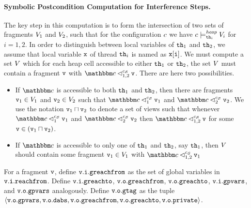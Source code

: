 \paragraph{Symbolic Postcondition Computation for Interference Steps.} 
The key step in this computation is
to form the intersection of two sets of fragments
$V_1$ and $V_2$, such that for the configuration $c$
we have $c \models_{{\tt th}_i}^{\mathit{heap}} V_i$ for $i=1,2$.
In order to distinguish
between local variables of ${\tt th}_1$ and ${\tt th}_2$, we assume that local variable $\mathtt{x}$ of thread ${\tt th}_i$ is named as $\mathtt{x[i]}$.
We must compute a set $V$ which for each
heap cell accessible to either ${\tt th}_1$ or ${\tt th}_2$, the set $V$ must
contain a fragment $\mathtt{v}$ with $\cell \satfrag{1,2}{\sconf} \frag$.
There are  here two possibilities.
\begin{itemize}
\item If $\cell$ is accessible to both ${\tt th}_1$ and ${\tt th}_2$, then
  there are fragments $\mathtt{v}_1 \in V_1$ and $\mathtt{v}_2 \in V_2$
  such that $\cell \satfrag{1}{\sconf} \frag_1$ and $\cell \satfrag{2}{\sconf} \frag_2$.
  We use the notation $\mathtt{v}_1 \sqcap \mathtt{v}_2$ to denote a set of views such that
  whenever $\cell \satfrag{1}{\sconf} \frag_1$ and $\cell \satfrag{2}{\sconf} \frag_2$ then
  $\cell \satfrag{1,2}{\sconf} \frag$ for some $\mathtt{v} \in (\mathtt{v}_1 \sqcap \mathtt{v}_2)$.
\item If $\cell$ is accessible to only one of ${\tt th}_1$ and ${\tt th}_2$,
  say ${\tt th}_1$, then $V$ should contain some fragment
  $\mathtt{v}_1 \in V_1$ with $\cell \satfrag{1,2}{\sconf} \frag_1$
\end{itemize}
For a fragment $\mathtt{v}$, define
$\mathtt{v}.\mathtt{i}.\mathtt{greachfrom}$ as the set of global variables in
$\mathtt{v}.\mathtt{i}.\mathtt{reachfrom}$. Define
$\mathtt{v}.\mathtt{i}.\mathtt{greachto}$,
$\mathtt{v}.\mathtt{o}.\mathtt{greachfrom}$,
$\mathtt{v}.\mathtt{o}.\mathtt{greachto}$,
$\mathtt{v}.\mathtt{i}.\mathtt{gpvars}$, and
$\mathtt{v}.\mathtt{o}.\mathtt{gpvars}$
analogously.
Define $\mathtt{v}.\mathtt{o}.\mathtt{gtag}$ as the tuple
$\left\langle\mathtt{v}.\mathtt{o}.\mathtt{gpvars},\mathtt{v}.\mathtt{o}.\mathtt{dabs},\mathtt{v}.\mathtt{o}.\mathtt{greachfrom},\mathtt{v}.\mathtt{o}.\mathtt{greachto},\mathtt{v}.\mathtt{o}.\mathtt{private}\right\rangle$.

 

